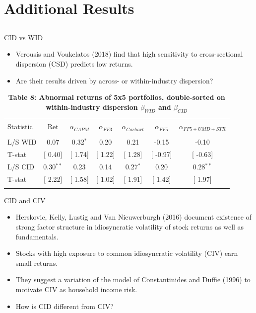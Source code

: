 \documentclass{beamer}
\begin{document}
\section{Additional Results}
\subsection{}


\normalsize
\begin{frame}{CID vs WID}
\begin{itemize}
    \item {Verousis and Voukelatos (2018) find that high sensitivity to cross-sectional dispersion (CSD) predicts low returns.}
    \item {Are their results driven by across- or within-industry dispersion?}
\end{itemize}
\scriptsize
\begin{table}[!htbp] \centering 
  \caption*{\textbf{Table 8: Abnormal returns of 5x5 portfolios, double-sorted on within-industry dispersion $\beta_{WID}$ and $\beta_{CID}$}} 
  \label{} 
\begin{tabular}{@{\extracolsep{5pt}} lcccccc} 
\\[-1.8ex]\hline 
\hline \\[-1.8ex] 
Statistic & Ret & $\alpha_{CAPM}$ & $\alpha_{FF3}$ & $\alpha_{Carhart}$ & $\alpha_{FF5}$ & $\alpha_{FF5+UMD+STR}$ \\ 
\hline \\[-1.8ex] 
L/S WID & 0.07 & 0.32$^{*}$ & 0.20 & 0.21 & -0.15 & -0.10 \\ 
T-stat & [ 0.40] & [ 1.74] & [ 1.22] & [ 1.28] & [ -0.97] & [ -0.63] \\ 
L/S CID & 0.30$^{**}$ & 0.23 & 0.14 & 0.27$^{*}$ & 0.20 & 0.28$^{**}$ \\ 
T-stat & [ 2.22] & [ 1.58] & [ 1.02] & [ 1.91] & [ 1.42] & [ 1.97] \\ 
\hline \\[-1.8ex] 
\end{tabular} 
\end{table}
\end{frame}


\normalsize
\begin{frame}{CID and CIV}
\begin{itemize}
    \item {Herskovic, Kelly, Lustig and Van Nieuwerburgh (2016) document existence of strong factor structure in idiosyncratic volatility of stock returns as well as fundamentals.}
    \item {Stocks with high exposure to common idiosyncratic volatility (CIV) earn small returns.}
    \item {They suggest a variation of the model of Constantinides and Duffie (1996) to motivate CIV as household income risk.}
    \item {How is CID different from CIV?}
\end{itemize}

\end{frame}
\end{document}
